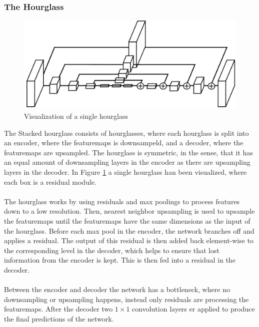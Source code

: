 \documentclass[./main.tex]{subfiles}
\begin{document}
\subsubsection{The Hourglass}
\begin{figure}[htbp]
    \centering
    \includegraphics[height = 4 cm]{entities/Hourglass.png}
    \caption{Visualization of a single hourglass \cite{Newell}}
    \label{fig:hourglass}
\end{figure}
\noindent The Stacked hourglass consists of hourglasses, where each hourglass is split into an encoder, where the featuremaps is downsampeld, and a decoder, where the featuremaps are upsampled. The hourglass is symmetric, in the sense, that it has an equal amount of downsampling layers in the encoder as there are upsampling layers in the decoder. In Figure \ref{fig:hourglass} a single hourglass han been visualized, where each box is a residual module.
\\
\\
The hourglass works by using residuals and max poolings to process features down to a low resolution. Then, nearest neighbor upsampling is used to upsample the featuremaps until the featuremaps have the same dimensions as the input of the hourglass. Before each max pool in the encoder, the network branches off and applies a residual. The output of this residual is then added back element-wise to the corresponding level in the decoder, which helps to ensure that lost information from the encoder is kept. This is then fed into a residual in the decoder.
\\
\\
Between the encoder and decoder the network has a bottleneck, where no downsampling or upsampling happens, instead only residuals are processing the featuremaps. After the decoder two $1 \times 1$ convolution layers er applied to produce the final predictions of the network.
\end{document}
